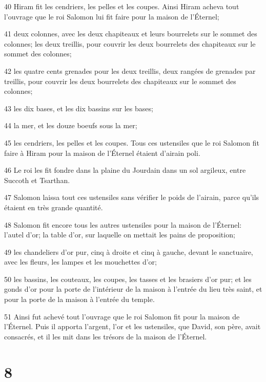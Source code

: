 \par 40 Hiram fit les cendriers, les pelles et les coupes. Ainsi Hiram acheva tout l'ouvrage que le roi Salomon lui fit faire pour la maison de l'Éternel;
\par 41 deux colonnes, avec les deux chapiteaux et leurs bourrelets sur le sommet des colonnes; les deux treillis, pour couvrir les deux bourrelets des chapiteaux sur le sommet des colonnes;
\par 42 les quatre cents grenades pour les deux treillis, deux rangées de grenades par treillis, pour couvrir les deux bourrelets des chapiteaux sur le sommet des colonnes;
\par 43 les dix bases, et les dix bassins sur les bases;
\par 44 la mer, et les douze boeufs sous la mer;
\par 45 les cendriers, les pelles et les coupes. Tous ces ustensiles que le roi Salomon fit faire à Hiram pour la maison de l'Éternel étaient d'airain poli.
\par 46 Le roi les fit fondre dans la plaine du Jourdain dans un sol argileux, entre Succoth et Tsarthan.
\par 47 Salomon laissa tout ces ustensiles sans vérifier le poids de l'airain, parce qu'ils étaient en très grande quantité.
\par 48 Salomon fit encore tous les autres ustensiles pour la maison de l'Éternel: l'autel d'or; la table d'or, sur laquelle on mettait les pains de proposition;
\par 49 les chandeliers d'or pur, cinq à droite et cinq à gauche, devant le sanctuaire, avec les fleurs, les lampes et les mouchettes d'or;
\par 50 les bassins, les couteaux, les coupes, les tasses et les brasiers d'or pur; et les gonds d'or pour la porte de l'intérieur de la maison à l'entrée du lieu très saint, et pour la porte de la maison à l'entrée du temple.
\par 51 Ainsi fut achevé tout l'ouvrage que le roi Salomon fit pour la maison de l'Éternel. Puis il apporta l'argent, l'or et les ustensiles, que David, son père, avait consacrés, et il les mit dans les trésors de la maison de l'Éternel.

\chapter{8}

